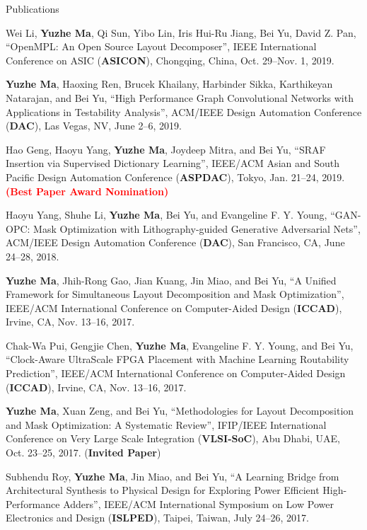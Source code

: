 \begin{rSection}{Publications}
\begin{etaremune}
\item{
        Wei Li, \textbf{Yuzhe Ma}, Qi Sun, Yibo Lin, Iris Hui-Ru Jiang, Bei Yu, David Z. Pan,
        ``OpenMPL: An Open Source Layout Decomposer'',
        IEEE International Conference on ASIC (\textbf{ASICON}), Chongqing, China, Oct. 29--Nov. 1, 2019.
}

\item{
	\textbf{Yuzhe Ma}, Haoxing Ren, Brucek Khailany, Harbinder Sikka, Karthikeyan Natarajan, and Bei Yu,
     ``High Performance Graph Convolutional Networks with Applications in Testability Analysis'',
     ACM/IEEE Design Automation Conference (\textbf{DAC}), Las Vegas, NV, June 2--6, 2019.
}

\item{
	Hao Geng, Haoyu Yang, \textbf{Yuzhe Ma}, Joydeep Mitra, and Bei Yu,
	``SRAF Insertion via Supervised Dictionary Learning'',
	IEEE/ACM Asian and South Pacific Design Automation Conference (\textbf{ASPDAC}), Tokyo, Jan. 21--24, 2019. \textbf{\textcolor{red}{(Best Paper Award Nomination)}}
}

\item{
	Haoyu Yang, Shuhe Li, \textbf{Yuzhe Ma}, Bei Yu, and Evangeline F. Y. Young,
	``GAN-OPC: Mask Optimization with Lithography-guided Generative Adversarial Nets'',
	ACM/IEEE Design Automation Conference (\textbf{DAC}), San Francisco, CA, June 24--28, 2018.
}

\item{
	\textbf{Yuzhe Ma}, Jhih-Rong Gao, Jian Kuang, Jin Miao, and Bei Yu,
	``A Unified Framework for Simultaneous Layout Decomposition and Mask Optimization'',
	IEEE/ACM International Conference on Computer-Aided Design (\textbf{ICCAD}), Irvine, CA, Nov. 13--16, 2017.
}

\item{
	Chak-Wa Pui, Gengjie Chen, \textbf{Yuzhe Ma}, Evangeline F. Y. Young, and Bei Yu,
	``Clock-Aware UltraScale FPGA Placement with Machine Learning Routability Prediction'',
	IEEE/ACM International Conference on Computer-Aided Design (\textbf{ICCAD}), Irvine, CA, Nov. 13--16, 2017.
}

\item{
    \textbf{Yuzhe Ma}, Xuan Zeng, and Bei Yu,
    ``Methodologies for Layout Decomposition and Mask Optimization: A Systematic Review'',
        IFIP/IEEE International Conference on Very Large Scale Integration (\textbf{VLSI-SoC}), Abu Dhabi, UAE, Oct. 23--25, 2017. (\textbf{Invited Paper})
}

\item{
    Subhendu Roy, \textbf{Yuzhe Ma}, Jin Miao, and Bei Yu,
    ``A Learning Bridge from Architectural Synthesis to Physical Design for Exploring Power Efficient High-Performance Adders'',
    IEEE/ACM International Symposium on Low Power Electronics and Design (\textbf{ISLPED}), Taipei, Taiwan, July 24--26, 2017.
}


\end{etaremune}
\end{rSection}
